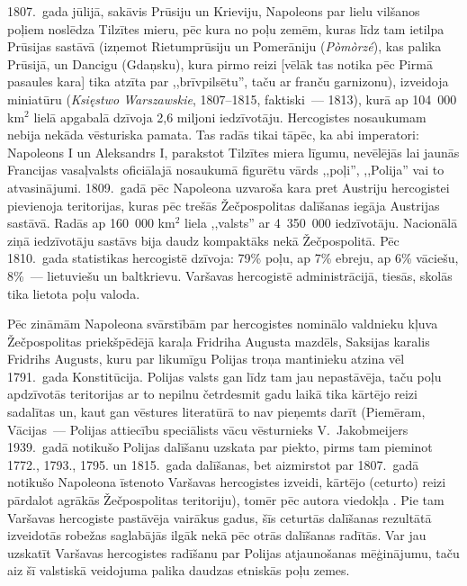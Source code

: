 \documentclass[twoside,a5paper,12pt,fleqn,openany]{extbook}
\newcommand{\pltxti}[1]{\textit{\textpolish{#1}}}
\begin{document}
1807.~gada jūlijā, sakāvis Prūsiju un Krieviju, Napoleons par lielu vilšanos poļiem noslēdza Tilzītes mieru, pēc kura no poļu zemēm, kuras līdz tam ietilpa Prūsijas sastāvā (izņemot Rietumprūsiju un Pomerāniju (\pltxti{Pòmòrzé}), kas palika Prūsijā, un Dancigu (Gdaņsku), kura pirmo reizi [vēlāk tas notika pēc Pirmā pasaules kara] tika atzīta par ,,brīvpilsētu'', taču ar franču garnizonu), izveidoja miniatūru  (\pltxti{Księstwo Warszawskie}, 1807--1815, faktiski~--- 1813), kurā ap 104~000 km$^{2}$ lielā apgabalā dzīvoja 2,6 miljoni iedzīvotāju. Hercogistes nosaukumam nebija nekāda vēsturiska pamata. Tas radās tikai tāpēc, ka abi imperatori: Napoleons I un Aleksandrs I, parakstot Tilzītes miera līgumu, nevēlējās lai jaunās Francijas vasaļvalsts oficiālajā nosaukumā figurētu vārds ,,poļi'', ,,Polija'' vai to atvasinājumi. 1809.~gadā pēc Napoleona uzvaroša kara pret Austriju hercogistei pievienoja teritorijas, kuras pēc trešās Žečpospolitas dalīšanas iegāja Austrijas sastāvā. Radās ap 160~000 km$^{2}$ liela ,,valsts'' ar 4~350~000 iedzīvotāju. Nacionālā ziņā iedzīvotāju sastāvs bija daudz kompaktāks nekā Žečpospolitā. Pēc 1810.~gada statistikas hercogistē dzīvoja: 79\% poļu, ap 7\% ebreju, ap 6\% vāciešu, 8\%~--- lietuviešu un baltkrievu. Varšavas hercogistē administrācijā, tiesās, skolās tika lietota poļu valoda.

Pēc zināmām Napoleona svārstībām par hercogistes nominālo valdnieku kļuva Žečpospolitas priekšpēdējā karaļa Fridriha Augusta mazdēls, Saksijas karalis Fridrihs Augusts, kuru par likumīgu Polijas troņa mantinieku atzina vēl 1791.~gada Konstitūcija. Polijas valsts gan līdz tam jau nepastāvēja, taču poļu apdzīvotās teritorijas ar to nepilnu četrdesmit gadu laikā tika kārtējo reizi sadalītas un, kaut gan vēstures literatūrā to nav pieņemts darīt (Piemēram, Vācijas~--- Polijas attiecību speciālists vācu vēsturnieks V.~Jakobmeijers 1939.~gadā notikušo Polijas dalīšanu uzskata par piekto, pirms tam pieminot 1772., 1793., 1795. un 1815.~gada dalīšanas, bet aizmirstot par 1807.~gadā notikušo Napoleona īstenoto Varšavas hercogistes izveidi, kārtējo (ceturto) reizi pārdalot agrākās Žečpospolitas teritoriju), tomēr pēc autora viedokļa . Pie tam Varšavas hercogiste pastāvēja vairākus gadus, šīs ceturtās dalīšanas rezultātā izveidotās robežas saglabājās ilgāk nekā pēc otrās dalīšanas radītās. Var jau uzskatīt Varšavas hercogistes radīšanu par Polijas atjaunošanas mēģinājumu, taču aiz šī valstiskā veidojuma palika daudzas etniskās poļu zemes.
\end{document}
